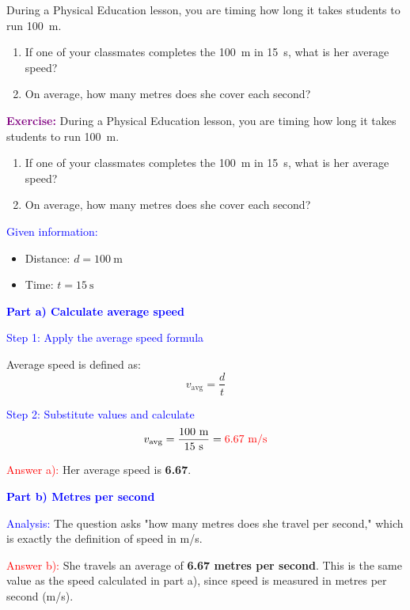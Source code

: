 \begin{exercise}
    During a Physical Education lesson, you are timing how long it takes students to run \qty{100}{\m}.
    \begin{enumerate}[label=\letraminuscula]
        \item If one of your classmates completes the \qty{100}{\m} in \qty{15}{\s}, what is her average speed?
        \item On average, how many metres does she cover each second?
    \end{enumerate}
    \begin{solu}
        \textbf{\textcolor{purple}{Exercise:}} During a Physical Education lesson, you are timing how long it takes students to run \qty{100}{\m}.
        \begin{enumerate}[label=\letraminuscula]
            \item If one of your classmates completes the \qty{100}{\m} in \qty{15}{\s}, what is her average speed?
            \item On average, how many metres does she cover each second?
        \end{enumerate}

        \vspace{0.3cm}

        \textcolor{blue}{Given information:}
        \begin{itemize}
            \item Distance: $d = \qty{100}{\m}$
            \item Time: $t = \qty{15}{\s}$
        \end{itemize}

        \textbf{\textcolor{blue}{Part a) Calculate average speed}}

        \textcolor{blue}{Step 1: Apply the average speed formula}

        Average speed is defined as:
        \[
            \boxed{v_{\text{avg}} = \frac{d}{t}}
        \]

        \textcolor{blue}{Step 2: Substitute values and calculate}
        \[
            v_{\text{avg}} = \frac{100 \text{ m}}{15 \text{ s}} = \textcolor{red}{6.67 \text{ m/s}}
        \]

        \textcolor{red}{Answer a):} Her average speed is \textbf{\qty{6.67}{\mps}}.

        \vspace{0.5cm}

        \textbf{\textcolor{blue}{Part b) Metres per second}}

        \textcolor{blue}{Analysis:} The question asks "how many metres does she travel per second," which is exactly the definition of speed in m/s.

        \textcolor{red}{Answer b):} She travels an average of \textbf{6.67 metres per second}. This is the same value as the speed calculated in part a), since speed is measured in metres per second (m/s).
    \end{solu}
\end{exercise}



